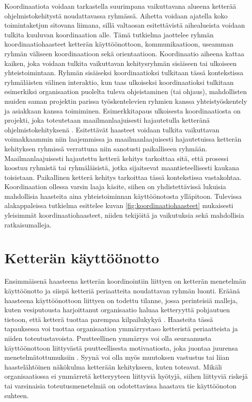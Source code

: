 Koordinaatiota voidaan tarkastella suurimpana vaikuttavana alueena ketterää ohjelmistokehitystä noudattavassa ryhmässä. Aihetta voidaan ajatella koko toimintaketjun sitovana liimana, sillä valtaosan esitettävistä aihealueista voidaan tulkita kuuluvan koordinaation alle. Tämä tutkielma jaottelee ryhmän koordinaatiohaasteet ketterän käyttöönottoon, kommunikaatioon, useamman ryhmän väliseen koordinaatioon sekä orientaatioon. Koordinaatio aiheena kattaa kaiken, joka voidaan tulkita vaikuttavan kehitysryhmän sisäiseen tai ulkoiseen yhteistoimintaan. Ryhmän sisäiseksi koordinaatioksi tulkitaan tässä kontekstissa ryhmäläisten välinen interaktio, kun taas ulkoiseksi koordinaatioksi tulkitaan esimerkiksi organisaation puolelta tuleva ohjeistaminen (tai ohjaus), mahdollisten muiden saman projektin parissa työskentelevien ryhmien kanssa yhteistyöskentely ja asiakkaan kanssa toimiminen. Esimerkkitapaus ulkoisesta koordinaatiosta on projekti, joka toteutetaan maailmanlaajuisesti hajautetulla ketteränä ohjelmistokehityksenä \cite{ALZOUBI201622}. Esitettävät haasteet voidaan tulkita vaikuttavan voimakkaammin niin laajemmissa ja maailmanlaajuisesti hajautetuissa ketterän kehityksen ryhmissä verrattuna niin sanotusti paikalliseen ryhmään. Maailmanlaajuisesti hajautettu ketterä kehitys tarkoittaa sitä, että prosessi koostuu ryhmistä tai ryhmäläisistä, jotka sijaitsevat maantieteellisesti kaukana toisistaan. Paikallinen ketterä kehitys tarkoittaa tässä kontekstissa vastakohtaa. Koordinaation ollessa varsin laaja käsite, siihen on yhdistettävissä lukuisia mahdollisia haasteita aina yhteistoiminnan käyttöönotosta ylläpitoon. Tulevissa alakappaleissa tutkielma esittelee kuvan \ref{fig:koordinaatiohaasteet} mukaisesti yleisimmät koordinaatiohaasteet, niiden tekijöitä ja vaikutuksia sekä mahdollisia ratkaisumalleja.

\section{Ketterän käyttöönotto}

Ensimmäisenä haasteena ketterän koordinointiin liittyen on ketterän menetelmän käyttöönotto ja siispä ketteriä periaatteita noudattavan ryhmän luonti. Eräänä haasteena käyttöönottoon liittyen on todettu tilanne, jossa perinteisiä malleja, kuten vesiputousta harjoittanut organisaatio haluaa ketteryyttä pohjautuen tietoon, että ketterä tuottaa parempaa kilpailukykyä \cite{MCKNIGHT2014168}. Haasteita tässä tapauksessa voi tuottaa organisaation ymmärrystaso ketteristä periaatteista ja niiden toteutustavoista. Puutteellinen ymmärrys voi olla seuraamusta käyttöönottoon liittyvästä puutteellisesta motivaatiosta, joka juontaa juurensa menetelmätottumuksiin \cite{GREGORY201692}. Syynä voi olla myös muutoksen vastustus tai liian haastelähtöinen näkökulma ketterään kehitykseen, kuten \cite{SELLERISILVA201520} toteavat. Mikäli organisaatiossa ei ymmärretä ketteryyteen liittyviä hyötyjä, siihen liittyviä riskejä tai varsinaisia toteutusmenetelmiä on odotettavissa haastava tie käyttöönoton suhteen.


